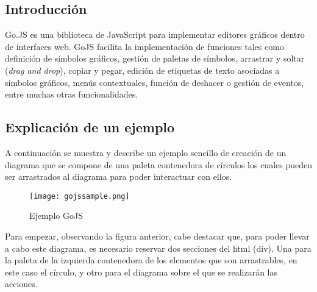 	 		

\subsection{Introducción}


Go.JS \cite{gojs} es una biblioteca de JavaScript para implementar editores gráficos dentro de interfaces web. GoJS facilita la implementación de funciones tales como definición de símbolos gráficos, gestión de paletas de símbolos, arrastrar y soltar (\emph{drag and drop}), copiar y pegar, edición de etiquetas de texto asociadas a símbolos gráficos, menús contextuales, función de deshacer o gestión de eventos, entre muchas otras funcionalidades.

\vspace{5mm}
	 		

\subsection{Explicación de un ejemplo}

A continuación se muestra y describe un ejemplo sencillo de creación de un diagrama que se compone de una paleta contenedora de círculos los cuales pueden ser arrastrados al diagrama para poder interactuar con ellos.

\vspace{5mm}

\begin{figure}[H]
	\centering
	\texttt{[image: gojssample.png]}
	\caption{Ejemplo GoJS}\label{fig:gojssample}
\end{figure}

\vspace{5mm}

Para empezar, observando la figura anterior, cabe destacar que, para poder llevar a cabo este diagrama, es necesario reservar dos secciones del html (div). Una para la paleta de la izquierda contenedora de los elementos que son arrastrables, en este caso el círculo, y otro para el diagrama sobre el que se realizarán las acciones.


